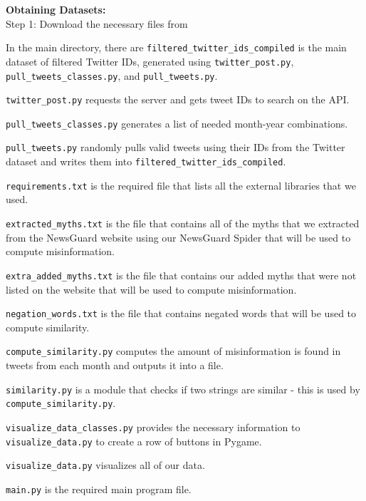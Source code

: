 \documentclass[fontsize=11pt]{article}
\begin{document}
    \begin{flushleft}

        \textbf{Obtaining Datasets:}\\

        Step 1: Download the necessary files from
        \hfill\break

        In the main directory, there are
        \texttt{filtered\_twitter\_ids\_compiled} is the main dataset of filtered Twitter IDs, generated using \texttt{twitter\_post.py}, \texttt{pull\_tweets\_classes.py}, and \texttt{pull\_tweets.py}.

        \texttt{twitter\_post.py} requests the server and gets tweet IDs to search on the API.

        \texttt{pull\_tweets\_classes.py} generates a list of needed month-year combinations.

        \texttt{pull\_tweets.py} randomly pulls valid tweets using their IDs from the Twitter dataset and writes them into \texttt{filtered\_twitter\_ids\_compiled}.
        \hfill\break

        \texttt{requirements.txt} is the required file that lists all the external libraries that we used.

        \texttt{extracted\_myths.txt} is the file that contains all of the myths that we extracted from the NewsGuard website using our NewsGuard Spider that will be used to compute misinformation.

        \texttt{extra\_added\_myths.txt} is the file that contains our added myths that were not listed on the website that will be used to compute misinformation.

        \texttt{negation\_words.txt} is the file that contains negated words that will be used to compute similarity.
        \hfill\break

        \texttt{compute\_similarity.py} computes the amount of misinformation is found in tweets from each month and outputs it into a file.

        \texttt{similarity.py} is a module that checks if two strings are similar - this is used by \texttt{compute\_similarity.py}.
        \hfill\break

        \texttt{visualize\_data\_classes.py} provides the necessary information to \texttt{visualize\_data.py} to create a row of buttons in Pygame.

        \texttt{visualize\_data.py} visualizes all of our data.
        \hfill\break

        \texttt{main.py} is the required main program file.
        \hfill\break


\end{flushleft}
\end{document}
